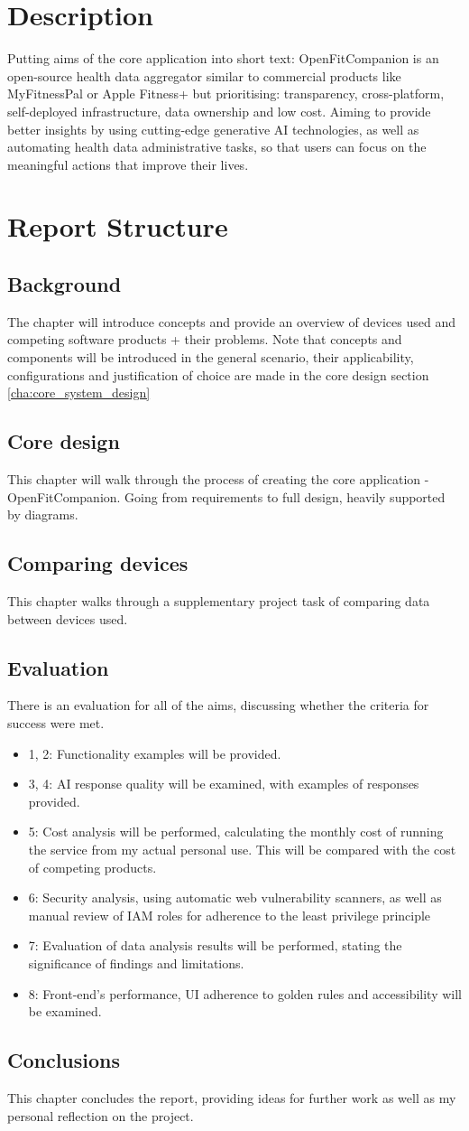 \section{Description}
Putting aims of the core application into short text: OpenFitCompanion is an open-source health data aggregator similar to commercial products like MyFitnessPal or Apple Fitness+ but prioritising: transparency, cross-platform, self-deployed infrastructure, data ownership and low cost. Aiming to provide better insights by using cutting-edge generative AI technologies, as well as automating health data administrative tasks, so that users can focus on the meaningful actions that improve their lives.
\section{Report Structure}
\subsection{Background}
The chapter will introduce concepts and provide an overview of devices used and competing software products + their problems. Note that concepts and components will be introduced in the general scenario, their applicability, configurations and justification of choice are made in the core design section \ref{cha:core_system_design}
\subsection{Core design}
This chapter will walk through the process of creating the core application - OpenFitCompanion. Going from requirements to full design, heavily supported by diagrams.
\subsection{Comparing devices}
This chapter walks through a supplementary project task of comparing data between devices used.
\subsection{Evaluation}
There is an evaluation for all of the aims, discussing whether the criteria for success were met.
\begin{itemize}
    \item 1, 2: Functionality examples will be provided.
    \item 3, 4: AI response quality will be examined, with examples of responses provided. 
    \item 5: Cost analysis will be performed, calculating the monthly cost of running the service from my actual personal use. This will be compared with the cost of competing products.
    \item 6: Security analysis, using automatic web vulnerability scanners, as well as manual review of IAM roles for adherence to the least privilege principle
    \item 7: Evaluation of data analysis results will be performed, stating the significance of findings and limitations.
    \item 8: Front-end's performance, UI adherence to golden rules and accessibility will be examined.
\end{itemize}
\subsection{Conclusions}
This chapter concludes the report, providing ideas for further work as well as my personal reflection on the project.
